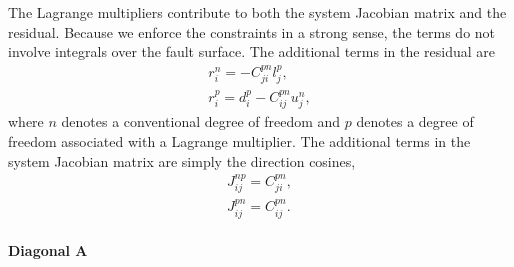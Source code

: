 The Lagrange multipliers contribute to both the system Jacobian matrix
and the residual. Because we enforce the constraints in a strong sense,
the terms do not involve integrals over the fault surface. The additional
terms in the residual are
\begin{gather}
r_{i}^{n}=-C_{ji}^{pn}l_{j}^{p},\\
r_{i}^{p}=d_{i}^{p}-C_{ij}^{pn}u_{j}^{n},
\end{gather}
where $n$ denotes a conventional degree of freedom and $p$ denotes
a degree of freedom associated with a Lagrange multiplier. The additional
terms in the system Jacobian matrix are simply the direction cosines,
\begin{gather}
J_{ij}^{np}=C_{ji}^{pn},\\
J_{ij}^{pn}=C_{ij}^{pn}.
\end{gather}

\paragraph{Diagonal A}

